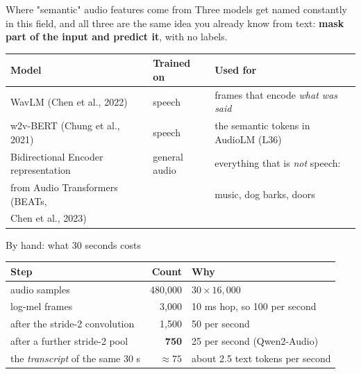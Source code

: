 \documentclass[aspectratio=169]{beamer}
\begin{document}
\begin{frame}{Where "semantic" audio features come from}
  \small
  Three models get named constantly in this field, and all three are the same idea you already
  know from text: \textbf{mask part of the input and predict it}, with no labels.
  \vskip 6pt
  \begin{center}
    \footnotesize
    \begin{tabular}{lll}
      \toprule
      \textbf{Model} & \textbf{Trained on} & \textbf{Used for} \\
      \midrule
      WavLM (Chen et al., 2022) & speech & frames that encode \emph{what was said} \\
      w2v-BERT (Chung et al., 2021) & speech & the semantic tokens in AudioLM (L36) \\
      Bidirectional Encoder representation & general audio & everything that is \emph{not} speech: \\
      from Audio Transformers (BEATs, & & music, dog barks, doors \\
      Chen et al., 2023) & & \\
      \bottomrule
    \end{tabular}
  \end{center}
  \vskip 6pt
\end{frame}

\begin{frame}{By hand: what 30 seconds costs}
  \small
  \begin{center}
    \begin{tabular}{lrl}
      \toprule
      \textbf{Step} & \textbf{Count} & \textbf{Why} \\
      \midrule
      audio samples & 480,000 & $30 \times 16{,}000$ \\
      log-mel frames & 3,000 & 10 ms hop, so 100 per second \\
      after the stride-2 convolution & 1,500 & 50 per second \\
      after a further stride-2 pool & \textbf{750} & 25 per second (Qwen2-Audio) \\
      \midrule
      \rowcolor{paramgreen!14}
      the \emph{transcript} of the same 30 s & $\approx 75$ & about 2.5 text tokens per second \\
      \bottomrule
    \end{tabular}
  \end{center}
  \vskip 8pt
\end{frame}
\end{document}
